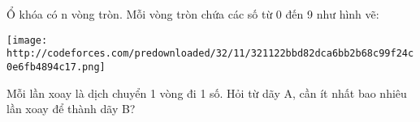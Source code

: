 Ổ khóa có n vòng tròn. Mỗi vòng tròn chứa các số từ 0 đến 9 như hình vẽ:


\texttt{[image: http://codeforces.com/predownloaded/32/11/321122bbd82dca6bb2b68c99f24c0e6fb4894c17.png]}

Mỗi lần xoay là dịch chuyển 1 vòng đi 1 số. Hỏi từ dãy A, cần ít nhất bao nhiêu lần xoay để thành dãy B?